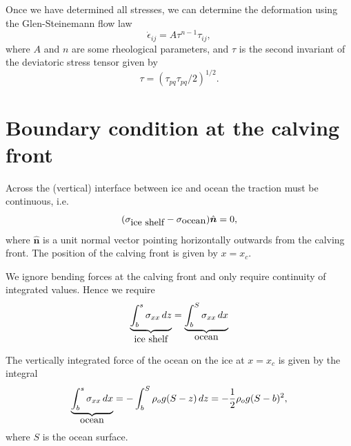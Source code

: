 \documentclass[10pt,a4paper]{book}
\newcommand{\eij}{\dot{\epsilon}_{ij}}
\newcommand{\tij}{\tau_{ij}}
\newcommand{\sxx}{\sigma_{xx}}
\newcommand{\normal}{\hat{\bm{n}}}
\begin{document}
Once we have determined all stresses, we can determine the deformation using
the Glen-Steinemann flow law 
\begin{equation}
\eij=A \tau^{n-1} \tij,
\label{eq:AGlen}
\end{equation}
where $A$ and $n$ are some rheological parameters, and $\tau$ is the
second invariant of the deviatoric stress tensor given by
\begin{equation}
\tau=\left ( \tau_{pq} \tau_{pq} /2\right )^{1/2} .
\label{eq:taueff}
\end{equation}

\section{Boundary condition at the calving front}


Across the (vertical) interface between ice and ocean the traction
must be continuous, i.e.\
\[
(\sigma_{\hbox{ice shelf}}-\sigma_{\hbox{ocean}} ) \normal=0 ,
\] 
where $\normal$ is a unit normal vector pointing horizontally outwards
from the calving front. The position of the calving front is given by
$x=x_c$.

We ignore bending forces at the calving front and only require
continuity of integrated values.  Hence we require
\begin{equation}	
\underbrace{\int_{b}^{s} \sxx \, dz}_{\hbox{ice shelf}} = \underbrace{\int_{b}^{S} \sxx \, dx }_{\hbox{ocean}}
\end{equation}



The vertically integrated force of the
ocean on the ice at $x=x_c$ is given by the integral
\begin{equation}
\underbrace{\int_{b}^{s} \sxx \, dx }_{\hbox{ocean}}=-\int_{b}^{S} \rho_o g (S-z) \, dz = -\frac{1}{2} \rho_o g (S-b)^2,
\label{eq:pshelf}
\end{equation}
where $S$ is the ocean surface.
\end{document}
